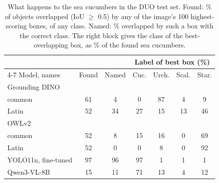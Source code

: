 \begin{table}[t]
\centering
\small
\setlength{\tabcolsep}{2.8pt}
\begin{tabular}{lcccccc}
\toprule
 & & & \multicolumn{4}{c}{Label of best box (\%)} \\
\cmidrule(lr){4-7}
Model, names & Found & Named & Cuc. & Urch. & Scal. & Star. \\
\midrule
\multicolumn{7}{l}{Grounding DINO} \\
\quad common & 61 & 4 & 0 & 87 & 4 & 9 \\
\quad Latin & 52 & 34 & 27 & 15 & 13 & 46 \\
\multicolumn{7}{l}{OWLv2} \\
\quad common & 52 & 8 & 15 & 16 & 0 & 69 \\
\quad Latin & 52 & 0 & 0 & 8 & 0 & 92 \\
\midrule
YOLO11n, fine-tuned & 97 & 96 & 97 & 1 & 1 & 1 \\
Qwen3-VL-8B & 15 & 11 & 71 & 13 & 4 & 12 \\
\bottomrule
\end{tabular}
\caption{What happens to the \nSeaCucumber{} sea cucumbers in the DUO test set. Found: \% of objects overlapped (IoU $\geq$ 0.5) by any of the image's 100 highest-scoring boxes, of any class. Named: \% overlapped by such a box with the correct class. The right block gives the class of the best-overlapping box, as \% of the found sea cucumbers.}
\label{tab:seacucumber}
\end{table}
